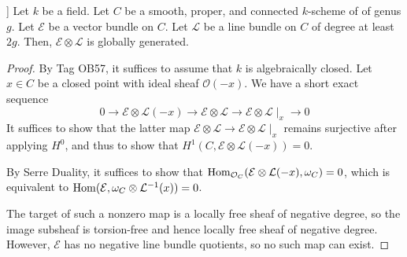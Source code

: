\begin{lemma}\label{global_generation_of_twist_on_curve}]
Let $k$ be a field.
Let $C$ be a smooth, proper, and connected $k$-scheme of of genus $g$.
Let $\mathcal{E}$ be a vector bundle on $C$. 
Let $\mathcal{L}$ be a line bundle on $C$ of degree at least $2g$. 
Then, $\mathcal{E}\otimes\mathcal{L}$ is globally generated.
\end{lemma}

\begin{proof}
By Tag OB57, it suffices to assume that $k$ is algebraically closed. 
Let $x\in C$ be a closed point with ideal sheaf $\mathcal{O}(-x)$. 
We have a short exact sequence
\begin{equation}
0\to\mathcal{E}\otimes\mathcal{L}(-x)\to\mathcal{E}\otimes\mathcal{L}\to\mathcal{E}\otimes\mathcal{L}\mid_x\to0
\end{equation}
It suffices to show that the latter map $\mathcal{E}\otimes\mathcal{L}\to\mathcal{E}\otimes\mathcal{L}\mid_x$ remains surjective after applying $H^0$, and thus to show that $H^1(C,\mathcal{E}\otimes\mathcal{L}(-x))=0$.

By Serre Duality, it suffices to show that $\mathop{\rm Hom}\nolimits_{\mathcal{O}_C}(\mathcal{E}\otimes\mathcal{L}(-x),\omega_C)=0$, which is equivalent to $\mathop{\rm Hom}\nolimits(\mathcal{E},\omega_C\otimes\mathcal{L}^{-1}(x))=0$.

The target of such a nonzero map is a locally free sheaf of negative degree, so the image subsheaf is torsion-free and hence locally free sheaf of negative degree. However, $\mathcal{E}$ has no negative line bundle quotients, so no such map can exist.
\end{proof}




